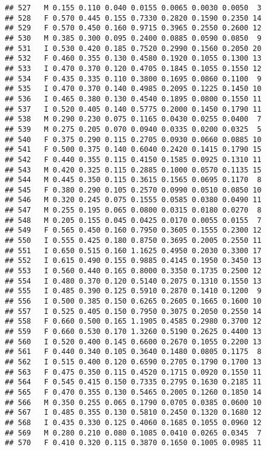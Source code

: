 \documentclass[
]{article}
\begin{document}
\begin{verbatim}
## 527   M 0.155 0.110 0.040 0.0155 0.0065 0.0030 0.0050  3
## 528   F 0.570 0.445 0.155 0.7330 0.2820 0.1590 0.2350 14
## 529   F 0.570 0.450 0.160 0.9715 0.3965 0.2550 0.2600 12
## 530   M 0.385 0.300 0.095 0.2400 0.0885 0.0590 0.0850  9
## 531   I 0.530 0.420 0.185 0.7520 0.2990 0.1560 0.2050 20
## 532   F 0.460 0.355 0.130 0.4580 0.1920 0.1055 0.1300 13
## 533   I 0.470 0.370 0.120 0.4705 0.1845 0.1055 0.1550 12
## 534   F 0.435 0.335 0.110 0.3800 0.1695 0.0860 0.1100  9
## 535   I 0.470 0.370 0.140 0.4985 0.2095 0.1225 0.1450 10
## 536   I 0.465 0.380 0.130 0.4540 0.1895 0.0800 0.1550 11
## 537   I 0.520 0.405 0.140 0.5775 0.2000 0.1450 0.1790 11
## 538   M 0.290 0.230 0.075 0.1165 0.0430 0.0255 0.0400  7
## 539   M 0.275 0.205 0.070 0.0940 0.0335 0.0200 0.0325  5
## 540   F 0.375 0.290 0.115 0.2705 0.0930 0.0660 0.0885 10
## 541   F 0.500 0.375 0.140 0.6040 0.2420 0.1415 0.1790 15
## 542   F 0.440 0.355 0.115 0.4150 0.1585 0.0925 0.1310 11
## 543   M 0.420 0.325 0.115 0.2885 0.1000 0.0570 0.1135 15
## 544   M 0.445 0.350 0.115 0.3615 0.1565 0.0695 0.1170  8
## 545   F 0.380 0.290 0.105 0.2570 0.0990 0.0510 0.0850 10
## 546   M 0.320 0.245 0.075 0.1555 0.0585 0.0380 0.0490 11
## 547   M 0.255 0.195 0.065 0.0800 0.0315 0.0180 0.0270  8
## 548   M 0.205 0.155 0.045 0.0425 0.0170 0.0055 0.0155  7
## 549   F 0.565 0.450 0.160 0.7950 0.3605 0.1555 0.2300 12
## 550   I 0.555 0.425 0.180 0.8750 0.3695 0.2005 0.2550 11
## 551   I 0.650 0.515 0.160 1.1625 0.4950 0.2030 0.3300 17
## 552   I 0.615 0.490 0.155 0.9885 0.4145 0.1950 0.3450 13
## 553   I 0.560 0.440 0.165 0.8000 0.3350 0.1735 0.2500 12
## 554   I 0.480 0.370 0.120 0.5140 0.2075 0.1310 0.1550 13
## 555   I 0.485 0.390 0.125 0.5910 0.2870 0.1410 0.1200  9
## 556   I 0.500 0.385 0.150 0.6265 0.2605 0.1665 0.1600 10
## 557   I 0.525 0.405 0.150 0.7950 0.3075 0.2050 0.2550 14
## 558   F 0.660 0.500 0.165 1.1905 0.4585 0.2980 0.3700 12
## 559   F 0.660 0.530 0.170 1.3260 0.5190 0.2625 0.4400 13
## 560   I 0.520 0.400 0.145 0.6600 0.2670 0.1055 0.2200 13
## 561   F 0.440 0.340 0.105 0.3640 0.1480 0.0805 0.1175  8
## 562   I 0.515 0.400 0.120 0.6590 0.2705 0.1790 0.1700 13
## 563   F 0.475 0.350 0.115 0.4520 0.1715 0.0920 0.1550 11
## 564   F 0.545 0.415 0.150 0.7335 0.2795 0.1630 0.2185 11
## 565   F 0.470 0.355 0.130 0.5465 0.2005 0.1260 0.1850 14
## 566   M 0.350 0.255 0.065 0.1790 0.0705 0.0385 0.0600 10
## 567   I 0.485 0.355 0.130 0.5810 0.2450 0.1320 0.1680 12
## 568   I 0.435 0.330 0.125 0.4060 0.1685 0.1055 0.0960 12
## 569   M 0.280 0.210 0.080 0.1085 0.0410 0.0265 0.0345  7
## 570   F 0.410 0.320 0.115 0.3870 0.1650 0.1005 0.0985 11

\end{verbatim}
\end{document}
